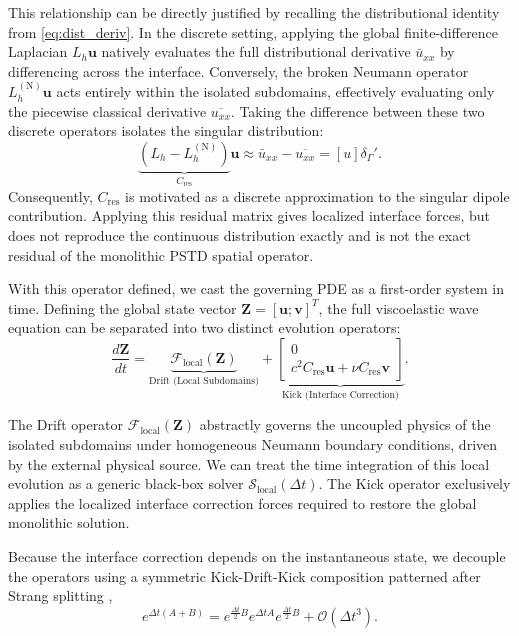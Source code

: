 \documentclass{Configuration_Files/PoliMi3i_thesis}
\newif\ifshowthesischanges
\DeclareRobustCommand{\thesischange}[2]{%
    \ifshowthesischanges
        \textcolor{#1}{#2}%
    \else
        #2%
    \fi
}
\def\thesischange#1#2{#2}%
\begin{document}
This relationship can be directly justified by recalling the distributional identity from \eqref{eq:dist_deriv}. In the discrete setting, applying the global finite-difference Laplacian $L_h \mathbf{u}$ natively evaluates the full distributional derivative $\bar{u}_{xx}$ by differencing across the interface. Conversely, the broken Neumann operator $L_h^{(\mathrm N)} \mathbf{u}$ acts entirely within the isolated subdomains, effectively evaluating only the piecewise classical derivative $\overline{u_{xx}}$. Taking the difference between these two discrete operators isolates the singular distribution:
\[
\underbrace{(L_h - L_h^{(\mathrm N)})}_{C_{\mathrm{res}}} \mathbf{u} \approx \bar{u}_{xx} - \overline{u_{xx}} = [u]\delta_\Gamma'.
\]
\thesischange{red}{Consequently, $C_{\mathrm{res}}$ is motivated as a discrete approximation to the singular dipole contribution. Applying this residual matrix gives localized interface forces, but does not reproduce the continuous distribution exactly and is not the exact residual of the monolithic PSTD spatial operator.}

With this operator defined, we cast the governing PDE as a first-order system in time. Defining the global state vector $\mathbf Z=[\mathbf u;\mathbf v]^T$, the full viscoelastic wave equation can be separated into two distinct evolution operators:
\begin{equation*}
\frac{d\mathbf Z}{dt}
=
\underbrace{
\mathcal{F}_{\mathrm{local}}(\mathbf Z)
}_{\text{Drift (Local Subdomains)}}
+
\underbrace{
\begin{bmatrix}
0\\
c^2C_{\mathrm{res}}\mathbf u+\nu C_{\mathrm{res}}\mathbf v
\end{bmatrix}
}_{\text{Kick (Interface Correction)}}.
\end{equation*}

The Drift operator $\mathcal{F}_{\mathrm{local}}(\mathbf Z)$ abstractly governs the uncoupled physics of the isolated subdomains under homogeneous Neumann boundary conditions, driven by the external physical source. We can treat the time integration of this local evolution as a generic black-box solver $\mathcal S_{\mathrm{local}}(\Delta t)$. 
The Kick operator exclusively applies the localized interface correction forces required to restore the global monolithic solution.

Because the interface correction depends on the instantaneous state, we decouple the operators using a symmetric Kick-Drift-Kick composition patterned after Strang splitting \thesischange{red}{\citep{strang_construction_1968}},
\begin{equation*}
e^{\Delta t(A+B)}
=
e^{\frac{\Delta t}{2}B}
e^{\Delta t A}
e^{\frac{\Delta t}{2}B}
+
\mathcal O(\Delta t^3).
\end{equation*}
\end{document}
